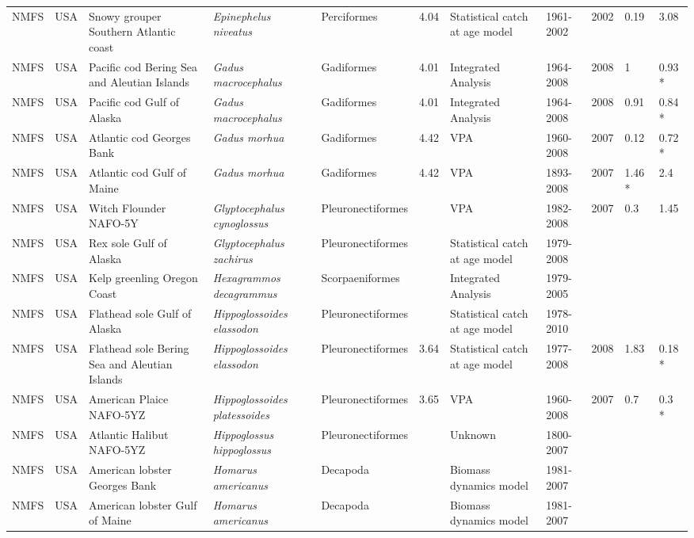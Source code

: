 \begin{longtable}{p{1.5cm}p{1.5cm}p{3cm}p{3cm}p{2.5cm}p{0.9cm}p{1.4cm}p{0.9cm}p{0.9cm}p{0.9cm}p{1cm}}
  NMFS & USA & Snowy grouper Southern Atlantic coast & \textit{Epinephelus niveatus} & Perciformes & 4.04 & Statistical catch at age model & 1961-2002 & 2002 & 0.19 & 3.08 \\ 
  NMFS & USA & Pacific cod Bering Sea and Aleutian Islands & \textit{Gadus macrocephalus} & Gadiformes & 4.01 & Integrated Analysis & 1964-2008 & 2008 & 1 & 0.93 * \\ 
  NMFS & USA & Pacific cod Gulf of Alaska & \textit{Gadus macrocephalus} & Gadiformes & 4.01 & Integrated Analysis & 1964-2008 & 2008 & 0.91 & 0.84 * \\ 
  NMFS & USA & Atlantic cod Georges Bank & \textit{Gadus morhua} & Gadiformes & 4.42 & VPA & 1960-2008 & 2007 & 0.12 & 0.72 * \\ 
  NMFS & USA & Atlantic cod Gulf of Maine & \textit{Gadus morhua} & Gadiformes & 4.42 & VPA & 1893-2008 & 2007 & 1.46 * & 2.4 \\ 
  NMFS & USA & Witch Flounder NAFO-5Y & \textit{Glyptocephalus cynoglossus} & Pleuronectiformes &  & VPA & 1982-2008 & 2007 & 0.3 & 1.45 \\ 
  NMFS & USA & Rex sole Gulf of Alaska & \textit{Glyptocephalus zachirus} & Pleuronectiformes &  & Statistical catch at age model & 1979-2008 &  &  &  \\ 
  NMFS & USA & Kelp greenling Oregon Coast & \textit{Hexagrammos decagrammus} & Scorpaeniformes &  & Integrated Analysis & 1979-2005 &  &  &  \\ 
  NMFS & USA & Flathead sole Gulf of Alaska & \textit{Hippoglossoides elassodon} & Pleuronectiformes &  & Statistical catch at age model & 1978-2010 &  &  &  \\ 
  NMFS & USA & Flathead sole Bering Sea and Aleutian Islands & \textit{Hippoglossoides elassodon} & Pleuronectiformes & 3.64 & Statistical catch at age model & 1977-2008 & 2008 & 1.83 & 0.18 * \\ 
  NMFS & USA & American Plaice NAFO-5YZ & \textit{Hippoglossoides platessoides} & Pleuronectiformes & 3.65 & VPA & 1960-2008 & 2007 & 0.7 & 0.3 * \\ 
  NMFS & USA & Atlantic Halibut NAFO-5YZ & \textit{Hippoglossus hippoglossus} & Pleuronectiformes &  & Unknown & 1800-2007 &  &  &  \\ 
  NMFS & USA & American lobster Georges Bank & \textit{Homarus americanus} & Decapoda &  & Biomass dynamics model & 1981-2007 &  &  &  \\ 
  NMFS & USA & American lobster Gulf of Maine & \textit{Homarus americanus} & Decapoda &  & Biomass dynamics model & 1981-2007 &  &  &  \\ 

\end{longtable}
